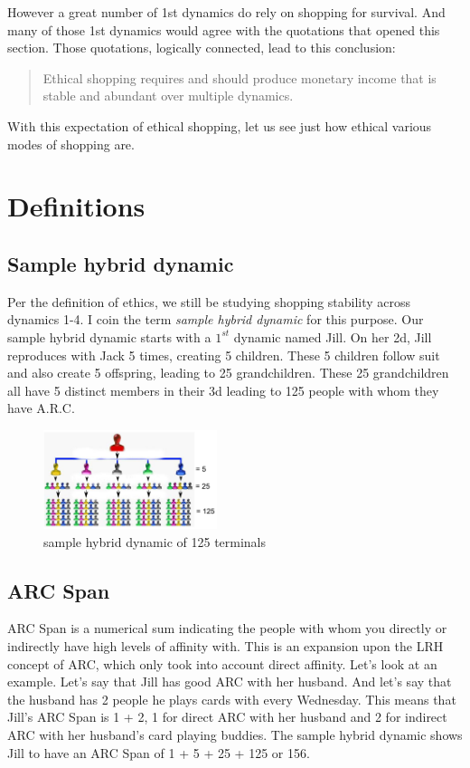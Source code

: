 \documentclass{article}%
\begin{document}
However a great number of 1st dynamics do rely on shopping for survival. And many of those 1st dynamics would agree with the quotations that opened this section. Those quotations, logically connected, lead to this conclusion:

\begin{quote}
Ethical shopping requires and should produce monetary income that is stable and abundant over multiple dynamics.
\end{quote}

With this expectation of ethical shopping, let us see just how ethical various modes of shopping are.

\section{Definitions}

\subsection{Sample hybrid dynamic}
Per the definition of ethics, we still be studying shopping stability across dynamics 1-4. I coin the term \emph{sample hybrid dynamic} for this purpose. Our sample hybrid dynamic starts with a $1^{st}$ dynamic named Jill. On her 2d, Jill reproduces with Jack 5 times, creating 5 children. These 5 children follow suit and also create 5 offspring, leading to 25 grandchildren. These 25 grandchildren all have 5 distinct members in their 3d leading to 125 people with whom they have A.R.C.  

\begin{figure}[h]
\centering
	\includegraphics[width=2in]{sample-hybrid.png}
	\caption{sample hybrid dynamic of 125 terminals}
	\label{fig:sampleHybridDynamicOf125Terminals}
\end{figure}

\subsection{ARC Span}\label{def:arc_span}
ARC Span is a numerical sum indicating the people with whom you directly or indirectly have high levels of affinity with. This is an expansion upon the LRH concept of ARC, which only took into account direct affinity. Let's look at an example. Let's say that Jill has good ARC with her husband. And let's say that the husband has 2 people he plays cards with every Wednesday. This means that Jill's ARC Span is 1 + 2, 1 for direct ARC with her husband and 2 for indirect ARC with her husband's card playing buddies. The sample hybrid dynamic shows Jill to have an ARC Span of 1 + 5 + 25 + 125 or 156.
\end{document}
